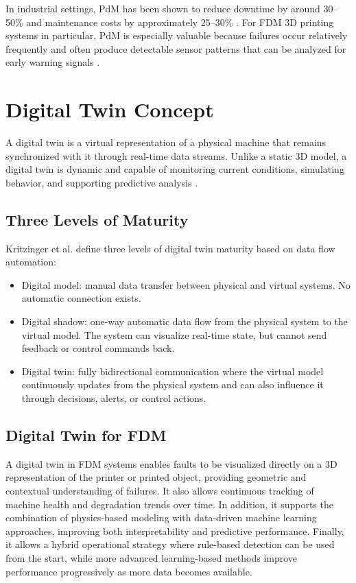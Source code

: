 In industrial settings, PdM has been shown to reduce downtime by around 30–50\% and maintenance costs by approximately 25–30\% \cite{thomas2021maintenance}. For FDM 3D printing systems in particular, PdM is especially valuable because failures occur relatively frequently and often produce detectable sensor patterns that can be analyzed for early warning signals \cite{song2016material}.

\section{Digital Twin Concept}

A digital twin is a virtual representation of a physical machine that remains synchronized with it through real-time data streams. Unlike a static 3D model, a digital twin is dynamic and capable of monitoring current conditions, simulating behavior, and supporting predictive analysis \cite{rasheed2020digital}.

\subsection{Three Levels of Maturity}

Kritzinger et al. \cite{kritzinger2018digital} define three levels of digital twin maturity based on data flow automation:

\begin{itemize}
    \item Digital model: manual data transfer between physical and virtual systems. No automatic connection exists.
    \item Digital shadow: one-way automatic data flow from the physical system to the virtual model. The system can visualize real-time state, but cannot send feedback or control commands back.
    \item Digital twin: fully bidirectional communication where the virtual model continuously updates from the physical system and can also influence it through decisions, alerts, or control actions.
\end{itemize}

\subsection{Digital Twin for FDM}

A digital twin in FDM systems enables faults to be visualized directly on a 3D representation of the printer or printed object, providing geometric and contextual understanding of failures. It also allows continuous tracking of machine health and degradation trends over time. In addition, it supports the combination of physics-based modeling with data-driven machine learning approaches, improving both interpretability and predictive performance. Finally, it allows a hybrid operational strategy where rule-based detection can be used from the start, while more advanced learning-based methods improve performance progressively as more data becomes available.

